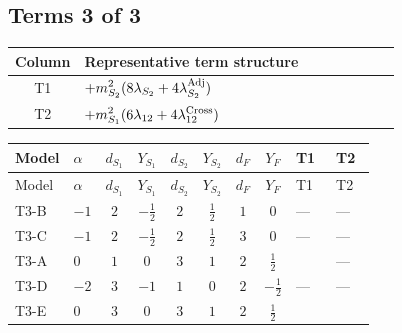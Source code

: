 \documentclass[8pt]{article}
\begin{document}
\begin{landscape}
\subsection*{Terms 3 of 3}
\begin{center}
\begin{tabular}{@{}c >{\raggedright\arraybackslash}p{0.82\linewidth}@{}}
\toprule
Column & Representative term structure \\
\midrule
T1 & \(\displaystyle +{m_{S_2}^2} (8 {\lambda_{S_2}}+4 {\lambda_{S_2}^{\rm Adj}})\) \\
\midrule
T2 & \(\displaystyle +{m_{S_1}^2} (6 {\lambda_{12}}+4 {\lambda_{12}^{\rm Cross}})\) \\
\midrule
\bottomrule
\end{tabular}
\end{center}
\smallskip
\tiny
\begin{longtable}{@{}llcccccc >{\raggedright\arraybackslash}p{0.21\linewidth} >{\raggedright\arraybackslash}p{0.21\linewidth}@{}}
\toprule
Model & $\alpha$ & $d_{S_1}$ & $Y_{S_1}$ & $d_{S_2}$ & $Y_{S_2}$ & $d_F$ & $Y_F$ & T1 & T2 \\
\midrule
\endfirsthead
\toprule
Model & $\alpha$ & $d_{S_1}$ & $Y_{S_1}$ & $d_{S_2}$ & $Y_{S_2}$ & $d_F$ & $Y_F$ & T1 & T2 \\
\midrule
\endhead
T3-B & $-1$ & $2$ & $-\frac{1}{2}$ & $2$ & $\frac{1}{2}$ & $1$ & $0$ & --- & --- \\
\midrule
T3-C & $-1$ & $2$ & $-\frac{1}{2}$ & $2$ & $\frac{1}{2}$ & $3$ & $0$ & --- & --- \\
\midrule
T3-A & $0$ & $1$ & $0$ & $3$ & $1$ & $2$ & $\frac{1}{2}$ & \scriptsize\adjustbox{max width=\linewidth}{$\begin{gathered} +{m_{S_2}^2} (8 {\lambda_{S_2}}+4 {\lambda_{S_2}^{\rm Adj}})\end{gathered}$} & --- \\
\midrule
T3-D & $-2$ & $3$ & $-1$ & $1$ & $0$ & $2$ & $-\frac{1}{2}$ & --- & --- \\
\midrule
T3-E & $0$ & $3$ & $0$ & $3$ & $1$ & $2$ & $\frac{1}{2}$ & \scriptsize\adjustbox{max width=\linewidth}{$\begin{gathered} +{m_{S_2}^2} (8 {\lambda_{S_2}}+4 {\lambda_{S_2}^{\rm Adj}})\end{gathered}$} & \scriptsize\adjustbox{max width=\linewidth}{$\begin{gathered} +{m_{S_1}^2} (6 {\lambda_{12}}+4 {\lambda_{12}^{\rm Cross}})\end{gathered}$} \\
\midrule
\bottomrule
\end{longtable}
\clearpage

\end{landscape}
\end{document}

